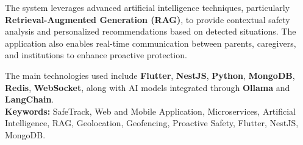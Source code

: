 The system leverages advanced artificial intelligence techniques, particularly \textbf{Retrieval-Augmented Generation (RAG)}, to provide contextual safety analysis and personalized recommendations based on detected situations. The application also enables real-time communication between parents, caregivers, and institutions to enhance proactive protection.

The main technologies used include \textbf{Flutter}, \textbf{NestJS}, \textbf{Python}, \textbf{MongoDB}, \textbf{Redis}, \textbf{WebSocket}, along with AI models integrated through \textbf{Ollama} and \textbf{LangChain}.\\

\noindent
\textbf{Keywords:} SafeTrack, Web and Mobile Application, Microservices, Artificial Intelligence, RAG, Geolocation, Geofencing, Proactive Safety, Flutter, NestJS, MongoDB.